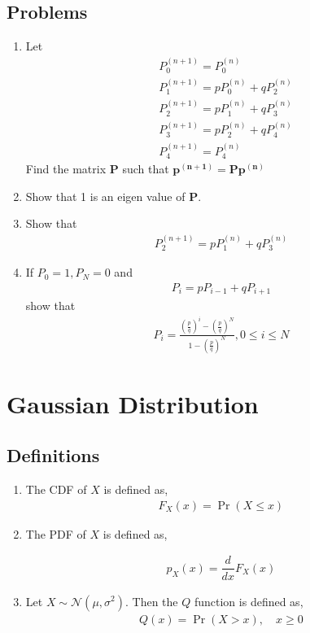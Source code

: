 \documentclass[journal,12pt,onecolumn]{IEEEtran}
\renewcommand\thesection{\arabic{section}}
\renewcommand\thesubsection{\thesection.\arabic{subsection}}
\providecommand{\pr}[1]{\ensuremath{\Pr\left(#1\right)}}
\theoremstyle{remark}
\numberwithin{equation}{section}
\let\vec\mathbf
\begin{document}
			


\subsection{Problems}
\begin{enumerate}[label=\arabic*.,ref=\thesubsection.\theenumi]
\item Let
\begin{align}
&P_0^{(n+1)} = P_0^{(n)}\\
&P_1^{(n+1)} = pP_0^{(n)} + qP_2^{(n)} \\
&P_2^{(n+1)} = pP_1^{(n)} + qP_3^{(n)} \\
&P_3^{(n+1)} = pP_2^{(n)} + qP_4^{(n)} \\
&P_4^{(n+1)} = P_4^{(n)}
\end{align}
Find the matrix $\vec{P}$ such that $\vec{p^{(n+1)}} = \vec{P}\vec{p^{(n)}}	$
\item Show that 1 is an eigen value of $\vec{P}.$
\item Show that 
\begin{align}
	P_2^{(n+1)} = pP_1^{(n)} + qP_3^{(n)}
\end{align}

\item If $P_0 =1, P_N = 0$ and
\begin{align}
P_i = p P_{i-1}+qP_{i+1}
\end{align}
	show that 
\begin{align}
P_i =	\frac{\left(\frac{p}{q}\right)^i-\left(\frac{p}{q}\right)^N}{1-\left(\frac{p}{q}\right)^N}, 0\leq i \leq N
\end{align}

\end{enumerate}
\section{Gaussian Distribution}
\subsection{Definitions}
\begin{enumerate}[label=\arabic*.,ref=\thesubsection.\theenumi]
\item The CDF of $X$ is defined as,
\begin{align}
	F_X(x) = \pr{X \leq x}
\end{align}
\item The PDF of $X$ is defined as,

\begin{align}
p_X(x) = \dfrac{d}{dx}F_X(x)
\end{align}
\item Let 
 $X \sim \mathcal{N}(\mu, \sigma^2)$.  Then the 
	$Q$ function is defined as,
\begin{align}
	Q(x) = \pr{X>x}, \quad x \ge 0
\end{align}
\end{enumerate}
\end{document}

